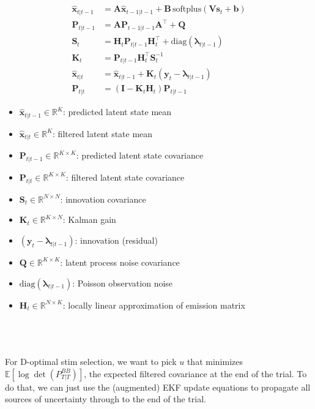 \documentclass[11pt,letterpaper]{article} %
\begin{document}
\noindent
\begin{minipage}[t]{0.47\textwidth}
\begin{align*}
    \hat{\bm{x}}_{t|t-1} &= \bm{A}\hat{\bm{x}}_{t-1|t-1} 
    + \bm{B}\,\text{softplus}\!\left(\bm{V}\bm{s}_t + \bm{b}\right) \\
    \bm{P}_{t|t-1}       &= \bm{A}\bm{P}_{t-1|t-1}\bm{A}^\top + \bm{Q} \\
    \bm{S}_t             &= \bm{H}_t \bm{P}_{t|t-1} \bm{H}_t^\top
                                + \text{diag}(\boldsymbol{\lambda}_{t|t-1}) \\
    \bm{K}_t             &= \bm{P}_{t|t-1}\bm{H}_t^\top \bm{S}_t^{-1} \\
    \hat{\bm{x}}_{t|t}   &= \hat{\bm{x}}_{t|t-1}
                                + \bm{K}_t(\bm{y}_t - \boldsymbol{\lambda}_{t|t-1}) \\
    \bm{P}_{t|t}         &= (\bm{I} - \bm{K}_t \bm{H}_t)\bm{P}_{t|t-1}
\end{align*}
\end{minipage}
\hfill\vline\hfill
\begin{minipage}[t]{0.47\textwidth}
\begin{itemize}[leftmargin=*, itemsep=0em, topsep=0.2em]
    \item $\hat{\bm{x}}_{t|t-1} \in \mathbb{R}^{K}$: predicted latent state mean
    \item $\hat{\bm{x}}_{t|t} \in \mathbb{R}^{K}$: filtered latent state mean
    \item $\bm{P}_{t|t-1} \in \mathbb{R}^{K \times K}$: predicted latent state covariance
    \item $\bm{P}_{t|t} \in \mathbb{R}^{K \times K}$: filtered latent state covariance
    \item $\bm{S}_t \in \mathbb{R}^{N \times N}$: innovation covariance
    \item $\bm{K}_t \in \mathbb{R}^{K \times N}$: Kalman gain
    \item $(\bm{y}_t - \boldsymbol{\lambda}_{t|t-1})$: innovation (residual)
    \item $\bm{Q} \in \mathbb{R}^{K \times K}$: latent process noise covariance
    \item $\text{diag}(\boldsymbol{\lambda}_{t|t-1})$: Poisson observation noise
    \item $\bm{H}_t \in \mathbb{R}^{N \times K}$: locally linear approximation of emission matrix
\end{itemize}
\end{minipage}
\\
\\
\\
\noindent For D-optimal stim selection, we want to pick $u$ that minimizes $\mathbb{E} \left[\log \det \left( P^{BB}_{T|T} \right)\right]$, the expected filtered covariance at the end of the trial. To do that, we can just use the (augmented) EKF update equations to propagate all sources of uncertainty through to the end of the trial.\\
\end{document}
